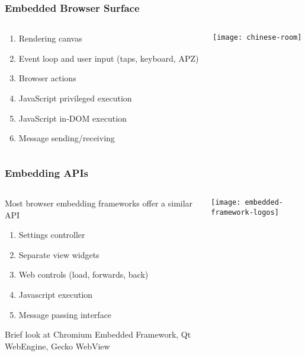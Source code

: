 \documentclass[
	notes=none,
	aspectratio=169
]{beamer}
\begin{document}
\begin{frame}
\frametitle{Embedded Browser Surface}

\begin{columns}[T]
\begin{column}[T]{0.7\textwidth}
\setlength{\parskip}{0.5em}

\vspace{1.0cm}
\begin{enumerate}
\setlength{\parskip}{0.5em}
\item Rendering canvas
\item Event loop and user input (taps, keyboard, APZ)
\item Browser actions
\item JavaScript privileged execution
\item JavaScript in-DOM execution
\item Message sending/receiving
\end{enumerate}

\end{column}
\begin{column}[T]{0.3\textwidth}
\setlength{\parskip}{0.5em}

\vspace{0.5cm}
\texttt{[image: chinese-room]}

\end{column}
\end{columns}

\end{frame}
\note{
}


\begin{frame}
\frametitle{Embedding APIs}

\begin{columns}[T]
\begin{column}[T]{0.73\textwidth}
\setlength{\parskip}{0.5em}

\vspace{1.0cm}
Most browser embedding frameworks offer a similar API
\begin{enumerate}
\setlength{\parskip}{0.5em}
\item Settings controller
\item Separate view widgets
\item Web controls (load, forwards, back)
\item Javascript execution
\item Message passing interface
\end{enumerate}
Brief look at Chromium Embedded Framework, Qt WebEngine, Gecko WebView

\end{column}
\begin{column}[T]{0.2\textwidth}
\setlength{\parskip}{0.5em}

\vspace{0.5cm}
\hspace{-1.0cm}
\texttt{[image: embedded-framework-logos]}

\end{column}
\end{columns}

\end{frame}
\note{
}
\end{document}

